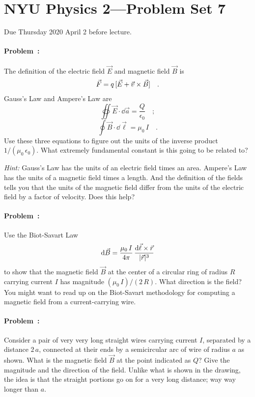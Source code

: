 \documentclass[12pt]{article}
\begin{document}
\section*{NYU Physics 2---Problem Set 7}

Due Thursday 2020 April 2 before lecture.

\paragraph{Problem~\theproblem:}%
The definition of the electric field $\vec{E}$ and magnetic field
$\vec{B}$ is
\begin{equation}
  \vec{F} = q\,[\vec{E} + \vec{v}\times\vec{B}]
  \quad .
\end{equation}
Gauss's Law and Ampere's Law are
\begin{equation}
  \oiint\vec{E}\cdot\dd\vec{a} = \frac{Q}{\epsilon_0}
  \quad ;
\end{equation}
\begin{equation}
  \oint\vec{B}\cdot\dd\vec{\ell} = \mu_0\,I
  \quad .
\end{equation}
Use these three equations to figure out the units of the inverse
product $1/(\mu_0\,\epsilon_0)$. What extremely fundamental constant
is this going to be related to?

\textit{Hint:} Gauss's Law has the units of an electric field times an
area. Ampere's Law has the units of a magnetic field times a
length. And the definition of the fields tells you that the units of
the magnetic field differ from the units of the electric field by a
factor of velocity. Does this help?

\paragraph{Problem~\theproblem:}%
Use the Biot-Savart Law
\begin{equation}
  \mathrm{d}\vec{B} = \frac{\mu_0\,I}{4\pi}\,\frac{\mathrm{d}\vec{\ell}\times\vec{r}}{|\vec{r}|^3}
\end{equation}
to show that the magnetic field $\vec{B}$ at the center of a circular
ring of radius $R$ carrying current $I$ has magnitude
$(\mu_0\,I)/(2\,R)$. What direction is the field? You might want to
read up on the Biot-Savart methodology for computing a magnetic field
from a current-carrying wire.

\paragraph{Problem~\theproblem:}%
Consider a pair of very very long straight wires carrying current $I$,
separated by a distance $2\,a$, connected at their ends by a
semicircular arc of wire of radius $a$ as shown. What is the magnetic
field $\vec{B}$ at the point indicated as $Q$? Give the magnitude and
the direction of the field. Unlike what is shown in the drawing,
the idea is that the straight portions go on for a very long distance;
way way longer than $a$.
\end{document}
